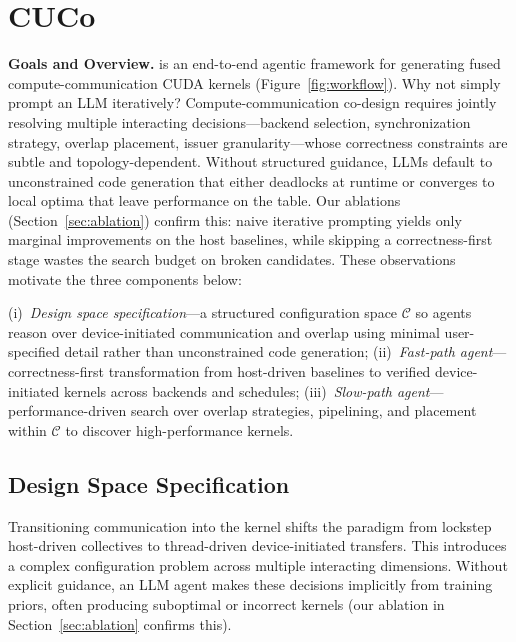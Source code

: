 \vspace{-10pt}
\section{CUCo}
\vspace{-10pt}
\noindent
{\bf Goals and Overview.}
\cufuse{} is an end-to-end agentic framework for generating fused compute-communication CUDA kernels (Figure~\ref{fig:workflow}). Why not simply prompt an LLM iteratively? Compute-communication co-design requires jointly resolving multiple interacting decisions---backend selection, synchronization strategy, overlap placement, issuer granularity---whose correctness constraints are subtle and topology-dependent. Without structured guidance, LLMs default to unconstrained code generation that either deadlocks at runtime or converges to local optima that leave performance on the table. Our ablations (Section~\ref{sec:ablation}) confirm this: naive iterative prompting yields only marginal improvements on the host baselines, while skipping a correctness-first stage wastes the search budget on broken candidates. These observations motivate the three components below:

(i)~\emph{Design space specification}---a structured configuration space $\mathcal{C}$ so agents reason over device-initiated communication and overlap using minimal user-specified detail rather than unconstrained code generation;
(ii)~\emph{Fast-path agent}---correctness-first transformation from host-driven baselines to verified device-initiated kernels across backends and schedules;
(iii)~\emph{Slow-path agent}---performance-driven search over overlap strategies, pipelining, and placement within $\mathcal{C}$ to discover high-performance kernels.

\vspace{-10pt}
\subsection{Design Space Specification}
\vspace{-8pt}
\label{subsec:design_space}

Transitioning communication into the kernel shifts the paradigm from lockstep host-driven collectives to thread-driven device-initiated transfers. This introduces a complex configuration problem across multiple interacting dimensions. Without explicit guidance, an LLM agent makes these decisions implicitly from training priors, often producing suboptimal or incorrect kernels (our ablation in Section~\ref{sec:ablation} confirms this).

